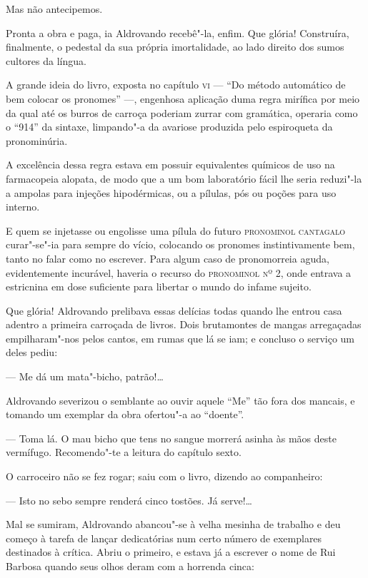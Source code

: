 Mas não antecipemos.

Pronta a obra e paga, ia Aldrovando recebê"-la, enfim. Que glória!
Construíra, finalmente, o pedestal da sua própria imortalidade, ao lado
direito dos sumos cultores da língua.

A grande ideia do livro, exposta no capítulo \textsc{vi} --- ``Do método
automático de bem colocar os pronomes'' ---, engenhosa aplicação duma
regra mirífica por meio da qual até os burros de carroça poderiam zurrar
com gramática, operaria como o ``914'' da sintaxe, limpando"-a da
avariose produzida pelo espiroqueta da pronominúria.

A excelência dessa regra estava em possuir equivalentes químicos de uso
na farmacopeia alopata, de modo que a um bom laboratório fácil lhe seria
reduzi"-la a ampolas para injeções hipodérmicas, ou a pílulas, pós ou
poções para uso interno.

E quem se injetasse ou engolisse uma pílula do futuro \textsc{pronominol
cantagalo} curar"-se"-ia para sempre do vício, colocando os pronomes
instintivamente bem, tanto no falar como no escrever. Para algum caso de
pronomorreia aguda, evidentemente incurável, haveria o recurso do
\textsc{pronominol nº 2}, onde entrava a estricnina em dose suficiente para
libertar o mundo do infame sujeito.

Que glória! Aldrovando prelibava essas delícias todas quando lhe entrou
casa adentro a primeira carroçada de livros. Dois brutamontes de mangas
arregaçadas empilharam"-nos pelos cantos, em rumas que lá se iam; e
concluso o serviço um deles pediu:

--- Me dá um mata"-bicho, patrão!\ldots{}

Aldrovando severizou o semblante ao ouvir aquele ``Me'' tão fora dos
mancais, e tomando um exemplar da obra ofertou"-a ao ``doente''.

--- Toma lá. O mau bicho que tens no sangue morrerá asinha às mãos deste
vermífugo. Recomendo"-te a leitura do capítulo sexto.

O carroceiro não se fez rogar; saiu com o livro, dizendo ao companheiro:

--- Isto no sebo sempre renderá cinco tostões. Já serve!\ldots{}

Mal se sumiram, Aldrovando abancou"-se à velha mesinha de trabalho e deu
começo à tarefa de lançar dedicatórias num certo número de exemplares
destinados à crítica. Abriu o primeiro, e estava já a escrever o nome de
Rui Barbosa quando seus olhos deram com a horrenda cinca:

